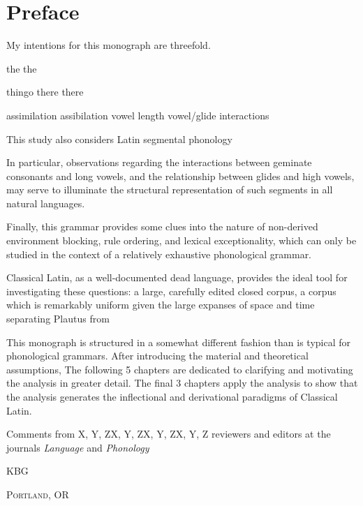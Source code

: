 \chapter*{Preface}
\label{preface}

My intentions for this monograph are threefold.

the the 

thingo there there

assimilation
assibilation
vowel length
vowel/glide interactions

This study also considers Latin segmental phonology 

In particular, observations regarding the interactions between geminate consonants and long vowels, and the relationship between glides and high vowels, may serve to illuminate the structural representation of such segments in all natural languages.

Finally, this grammar provides some clues into the nature of non-derived environment blocking, rule ordering, and lexical exceptionality, which can only be studied in the context of a relatively exhaustive phonological grammar.

Classical Latin, as a well-documented dead language, provides the ideal tool for investigating these questions: a large, carefully edited closed corpus, a corpus which is remarkably uniform given the large expanses of space and time separating Plautus from 

This monograph is structured in a somewhat different fashion than is typical for phonological grammars.
After introducing the material and theoretical assumptions,
The following 5 chapters are dedicated to clarifying and motivating the analysis in greater detail.
The final 3 chapters apply the analysis to show that the analysis generates the inflectional and derivational paradigms of Classical Latin.

Comments from X, Y, ZX, Y, ZX, Y, ZX, Y, Z
reviewers and editors at the journals \emph{Language} and \emph{Phonology}


\hfill\textsc{KBG}
\vspace{\baselineskip}

\noindent
\textsc{Portland, OR}\\
\textsc{\monthname~\the\year}
